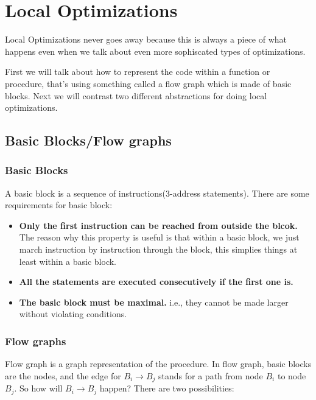 \section{Local Optimizations}

Local Optimizations never goes away because this is always a piece of what happens even when we 
talk about even more sophiscated types of optimizations.

First we will talk about how to represent the code within a function or procedure, that's using 
something called a flow graph which is made of basic blocks.  Next we will contrast two different 
abstractions for doing local optimizations.




\subsection{Basic Blocks/Flow graphs} 


\subsubsection{Basic Blocks}

A basic block is a sequence of instructions(3-address statements). There are some requirements for basic 
block:

\begin{itemize}
    \item \textbf{Only the first instruction can be reached from outside the blcok.} The reason why this property 
    is useful is that within a basic block, we just march instruction by instruction through the block, 
    this simplies things at least within a basic block.
    \item \textbf{All the statements are executed consecutively if the first one is.}
    \item \textbf{The basic block must be maximal.} i.e., they cannot be made larger without violating conditions. 
\end{itemize}


\subsubsection{Flow graphs}
Flow graph is a graph representation of the procedure. In flow graph, basic blocks are the nodes, and the edge for \(  B_i 
\rightarrow B_j \) stands for a path from node \( B_i \) to node \( B_j \). So how will \(  B_i  \rightarrow B_j \) happen? 
There are two possibilities:

